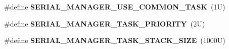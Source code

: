 \begin{DoxyCompactItemize}
\mbox{\label{group__serialmanager_gaae959bcddd181966d6c8bf4cbf140fea}} 
\#define {\bfseries S\+E\+R\+I\+A\+L\+\_\+\+M\+A\+N\+A\+G\+E\+R\+\_\+\+U\+S\+E\+\_\+\+C\+O\+M\+M\+O\+N\+\_\+\+T\+A\+SK}~(1\+U)
\item 
\mbox{\label{group__serialmanager_ga9bffc03255c48dae79cc2702f0980269}} 
\#define {\bfseries S\+E\+R\+I\+A\+L\+\_\+\+M\+A\+N\+A\+G\+E\+R\+\_\+\+T\+A\+S\+K\+\_\+\+P\+R\+I\+O\+R\+I\+TY}~(2\+U)
\item 
\mbox{\label{group__serialmanager_ga460c59805f2a8ec37e008b5a285e1760}} 
\#define {\bfseries S\+E\+R\+I\+A\+L\+\_\+\+M\+A\+N\+A\+G\+E\+R\+\_\+\+T\+A\+S\+K\+\_\+\+S\+T\+A\+C\+K\+\_\+\+S\+I\+ZE}~(1000\+U)
\end{DoxyCompactItemize}
